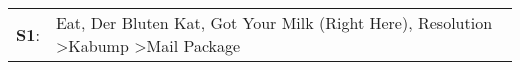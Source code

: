 \begin{supertabular}{p{0.03\textwidth}p{0.92\textwidth}}
 \textbf{S1}:  &  Eat\textsuperscript{}, \enspace Der Bluten Kat\textsuperscript{}, \enspace Got Your Milk (Right Here)\textsuperscript{}, \enspace Resolution\textsuperscript{} \textgreater \enspace Kabump\textsuperscript{} \textgreater \enspace Mail Package\textsuperscript{}  \enspace  \\
\end{supertabular}
